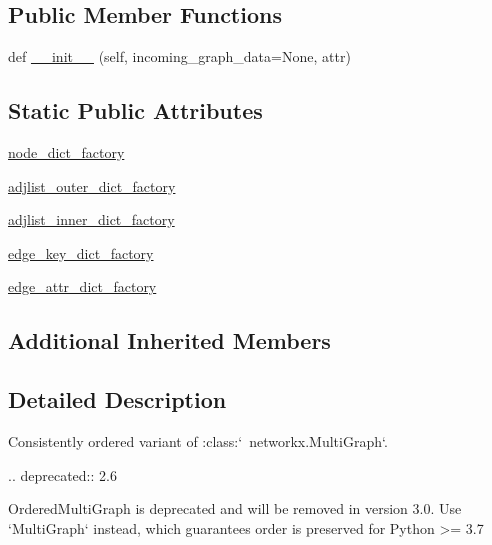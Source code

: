 \subsection*{Public Member Functions}
\begin{DoxyCompactItemize}
\item 
def \hyperlink{classnetworkx_1_1classes_1_1ordered_1_1OrderedMultiGraph_ab0464819e6774073790e8c7c8cb92d2c}{\+\_\+\+\_\+init\+\_\+\+\_\+} (self, incoming\+\_\+graph\+\_\+data=None, attr)
\end{DoxyCompactItemize}
\subsection*{Static Public Attributes}
\begin{DoxyCompactItemize}
\item 
\hyperlink{classnetworkx_1_1classes_1_1ordered_1_1OrderedMultiGraph_a71c05fb5ec3d75bbeedf14fde6ac8afd}{node\+\_\+dict\+\_\+factory}
\item 
\hyperlink{classnetworkx_1_1classes_1_1ordered_1_1OrderedMultiGraph_aefe58f4d7214e0e3cb1149fb052b3558}{adjlist\+\_\+outer\+\_\+dict\+\_\+factory}
\item 
\hyperlink{classnetworkx_1_1classes_1_1ordered_1_1OrderedMultiGraph_a5fe183cf023c93aa64d3b9b6fe4f55df}{adjlist\+\_\+inner\+\_\+dict\+\_\+factory}
\item 
\hyperlink{classnetworkx_1_1classes_1_1ordered_1_1OrderedMultiGraph_a68d511c3b943d52d563c525c1b8c95e1}{edge\+\_\+key\+\_\+dict\+\_\+factory}
\item 
\hyperlink{classnetworkx_1_1classes_1_1ordered_1_1OrderedMultiGraph_a9269bc7f607c95df870696ddc9c04dfd}{edge\+\_\+attr\+\_\+dict\+\_\+factory}
\end{DoxyCompactItemize}
\subsection*{Additional Inherited Members}


\subsection{Detailed Description}
\begin{DoxyVerb}Consistently ordered variant of :class:`~networkx.MultiGraph`.

.. deprecated:: 2.6

   OrderedMultiGraph is deprecated and will be removed in version 3.0.
   Use `MultiGraph` instead, which guarantees order is preserved for
   Python >= 3.7
\end{DoxyVerb}
 

